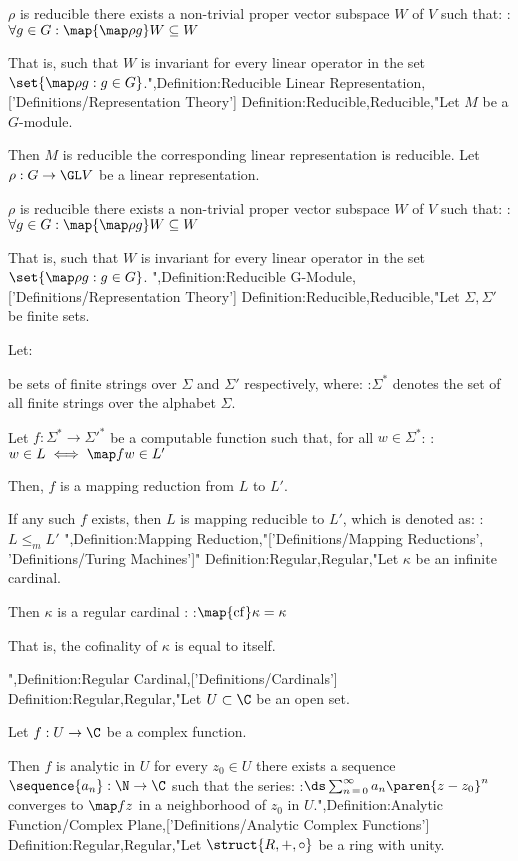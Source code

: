 $\rho$ is reducible  there exists a non-trivial proper vector subspace $W$ of $V$ such that:
:$\forall g \in G: \map {\map \rho g} W \subseteq W$


That is, such that $W$ is invariant for every linear operator in the set $\set {\map \rho g: g \in G}$.",Definition:Reducible Linear Representation,['Definitions/Representation Theory']
Definition:Reducible,Reducible,"Let $M$ be a $G$-module.

Then $M$ is reducible  the corresponding linear representation is reducible.
Let $\rho: G \to \GL V$ be a linear representation.


$\rho$ is reducible  there exists a non-trivial proper vector subspace $W$ of $V$ such that:
:$\forall g \in G: \map {\map \rho g} W \subseteq W$


That is, such that $W$ is invariant for every linear operator in the set $\set {\map \rho g: g \in G}$.
",Definition:Reducible G-Module,['Definitions/Representation Theory']
Definition:Reducible,Reducible,"Let $\Sigma, \Sigma'$ be finite sets.

Let:






be sets of finite strings over $\Sigma$ and $\Sigma'$ respectively, where:
:$\Sigma^*$ denotes the set of all finite strings over the alphabet $\Sigma$.

Let $f : \Sigma^* \to \Sigma'^*$ be a computable function such that, for all $w \in \Sigma^*$:
:$w \in L \iff \map f w \in L'$

Then, $f$ is a mapping reduction from $L$ to $L'$.


If any such $f$ exists, then $L$ is mapping reducible to $L'$, which is denoted as:
:$L \le_m L'$
",Definition:Mapping Reduction,"['Definitions/Mapping Reductions', 'Definitions/Turing Machines']"
Definition:Regular,Regular,"Let $\kappa$ be an infinite cardinal.


Then $\kappa$ is a regular cardinal :
:$\map {\mathrm {cf} } \kappa = \kappa$

That is,  the cofinality of $\kappa$ is equal to itself.

",Definition:Regular Cardinal,['Definitions/Cardinals']
Definition:Regular,Regular,"Let $U \subset \C$ be an open set.

Let $f : U \to \C$ be a complex function.


Then $f$ is analytic in $U$  for every $z_0 \in U$ there exists a sequence $\sequence {a_n}: \N \to \C$ such that the series:
:$\ds \sum_{n \mathop = 0}^\infty a_n \paren {z - z_0}^n$
converges to $\map f z$ in a neighborhood of $z_0$ in $U$.",Definition:Analytic Function/Complex Plane,['Definitions/Analytic Complex Functions']
Definition:Regular,Regular,"Let $\struct {R, +, \circ}$ be a ring with unity.

